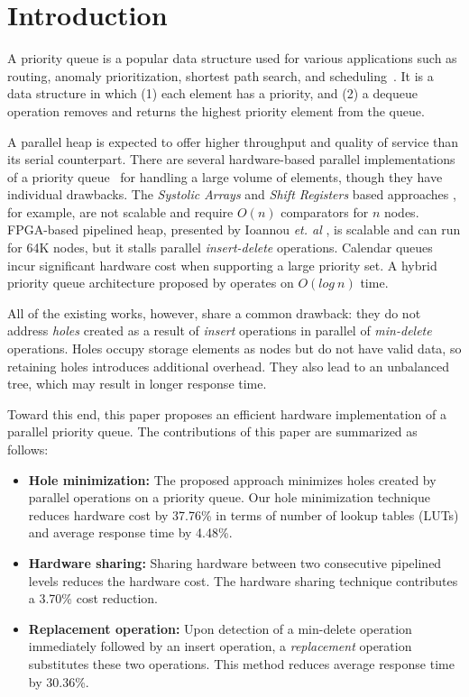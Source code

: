 \section{Introduction}
A priority queue is a popular data structure used for various applications such as routing, anomaly prioritization, shortest path search, and scheduling~\cite{ah1,ah2,ah3}.
It is a data structure in which (1) each element has a priority, and (2) a dequeue operation removes and returns the highest priority element from the queue.

A parallel heap is expected to offer higher throughput and quality of service than its serial counterpart.
There are several hardware-based parallel implementations of a priority queue~\cite{hw1,hw2,hw8,hw9,fpga1,fpga2,fpga3} for handling a large volume of elements, though they have individual drawbacks.
The {\it Systolic Arrays} and {\it Shift Registers} based approaches \cite{hw8,hw9}, for example, are not scalable and require $O(n)$ comparators for $n$ nodes.
FPGA-based pipelined heap, presented by Ioannou {\it et. al} \cite{fpga1}, is scalable and can run for 64K nodes, but it stalls parallel {\it insert-delete} operations. Calendar queues \cite{hw1} incur significant hardware cost when supporting a large priority set. A hybrid priority queue architecture proposed by \cite{hwsw1} operates on $O(log \ n)$ time.

All of the existing works, however, share a common drawback: they do not address {\it holes} created as a result of {\it insert} operations in parallel of {\it min-delete} operations. 
Holes occupy storage elements as nodes but do not have valid data, so retaining holes introduces additional overhead.
They also lead to an unbalanced tree, which may result in longer response time.

Toward this end, this paper proposes an efficient hardware implementation of a parallel priority queue.
The contributions of this paper are summarized as follows:
\begin{itemize}
\item {\bf Hole minimization:} The proposed approach minimizes holes created by parallel operations on a priority queue. Our hole minimization technique reduces hardware cost by 37.76\% in terms of number of lookup tables (LUTs) and average response time by 4.48\%.
\item {\bf Hardware sharing:} Sharing hardware between two consecutive pipelined levels reduces the hardware cost. The hardware sharing technique contributes a 3.70\% cost reduction.
\item {\bf Replacement operation:} Upon detection of a min-delete operation immediately followed by an insert operation, a {\it replacement} operation substitutes these two operations. This method reduces average response time by 30.36\%.
\end{itemize}


